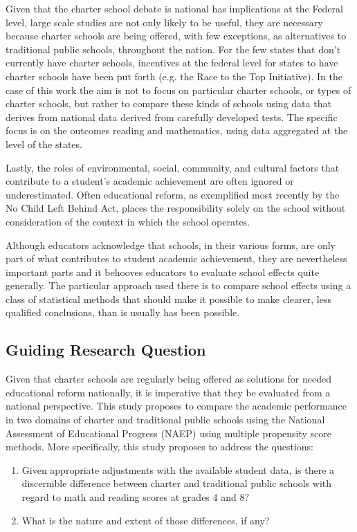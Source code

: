 \documentclass[letterpaper,12pt]{article}
\begin{document}
Given that the charter school debate is national has implications at the Federal level, large scale studies are not only likely to be useful, they are necessary because charter schools are being offered, with few exceptions, as alternatives to traditional public schools, throughout the nation. For the few states that don't currently have charter schools, incentives at the federal level for states to have charter schools have been put forth (e.g. the Race to the Top Initiative). In the case of this work the aim is not to focus on particular charter schools, or types of charter schools, but rather to compare these kinds of schools using data that derives from national data derived from carefully developed tests. The specific focus is on the outcomes reading and mathematics, using data aggregated at the level of the states.

Lastly, the roles of environmental, social, community, and cultural factors that contribute to a student's academic achievement are often ignored or underestimated. Often educational reform, as exemplified most recently by the No Child Left Behind Act, places the responsibility solely on the school without consideration of the context in which the school operates. 

Although educators acknowledge that schools, in their various forms, are only part of what contributes to student academic achievement, they are nevertheless important parts and it behooves educators to evaluate school effects quite generally. The particular approach used there is to compare school effects using a class of statistical methods that should make it possible to make clearer, less qualified conclusions, than is usually has been possible. 

\subsection{Guiding Research Question} 
Given that charter schools are regularly being offered as solutions for needed educational reform nationally, it is imperative that they be evaluated from a national perspective. This study proposes to compare the academic performance in two domains of charter and traditional public schools using the National Assessment of Educational Progress (NAEP) using multiple propensity score methods. More specifically, this study proposes to address the questions:

\begin{enumerate} 
	\item Given appropriate adjustments with the available student data, is there a discernible difference between charter and traditional public schools with regard to math and reading scores at grades 4 and 8?
	\item What is the nature and extent of those differences, if any? 
\end{enumerate}
\end{document}

